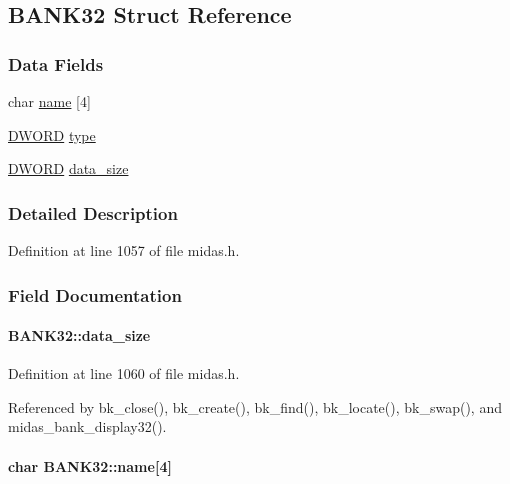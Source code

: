\subsection{BANK32 Struct Reference}
\label{structBANK32}
\subsubsection*{Data Fields}
\begin{DoxyCompactItemize}
\item 
char \hyperlink{structBANK32_a048e3afc084c62bffb7af80f110c30c3}{name} \mbox{[}4\mbox{]}
\item 
\hyperlink{vt2_8h_a798af1e30bc65f319c1a246cecf59e39}{DWORD} \hyperlink{structBANK32_a24b3068dc97237c8525e2188586a2c1b}{type}
\item 
\hyperlink{vt2_8h_a798af1e30bc65f319c1a246cecf59e39}{DWORD} \hyperlink{structBANK32_a211ae680238a01caef15677d73d2ee9f}{data\_\-size}
\end{DoxyCompactItemize}


\subsubsection{Detailed Description}


Definition at line 1057 of file midas.h.

\subsubsection{Field Documentation}
\paragraph[{data\_\-size}]{ {\bf BANK32::data\_\-size}}\hfill\label{structBANK32_a211ae680238a01caef15677d73d2ee9f}

\begin{DoxyItemize}
\item 
\end{DoxyItemize}

Definition at line 1060 of file midas.h.

Referenced by bk\_\-close(), bk\_\-create(), bk\_\-find(), bk\_\-locate(), bk\_\-swap(), and midas\_\-bank\_\-display32().
\paragraph[{name}]{\setlength{\rightskip}{0pt plus 5cm}char {\bf BANK32::name}\mbox{[}4\mbox{]}}\hfill\label{structBANK32_a048e3afc084c62bffb7af80f110c30c3}

